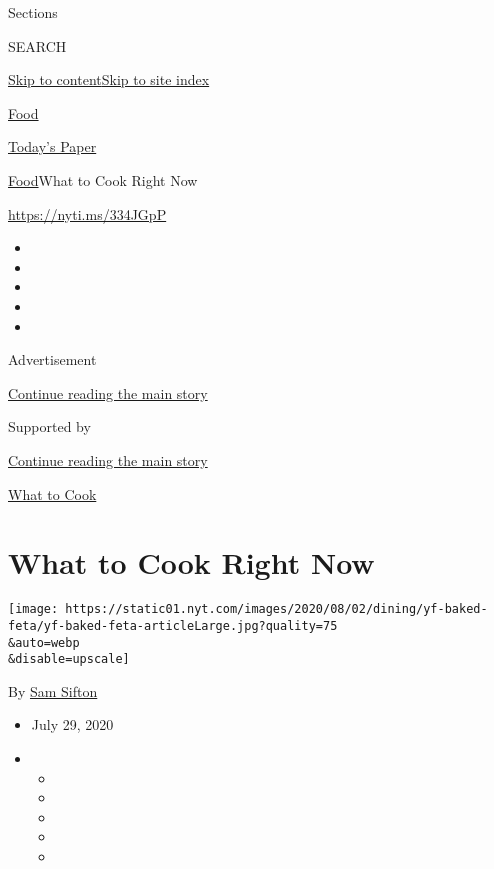 Sections

SEARCH

\protect\hyperlink{site-content}{Skip to
content}\protect\hyperlink{site-index}{Skip to site index}

\href{https://www.nytimes.com/section/food}{Food}

\href{https://myaccount.nytimes.com/auth/login?response_type=cookie\&client_id=vi}{}

\href{https://www.nytimes.com/section/todayspaper}{Today's Paper}

\href{/section/food}{Food}\textbar{}What to Cook Right Now

\url{https://nyti.ms/334JGpP}

\begin{itemize}
\item
\item
\item
\item
\item
\end{itemize}

Advertisement

\protect\hyperlink{after-top}{Continue reading the main story}

Supported by

\protect\hyperlink{after-sponsor}{Continue reading the main story}

\href{/column/what-to-cook}{What to Cook}

\hypertarget{what-to-cook-right-now}{%
\section{What to Cook Right Now}\label{what-to-cook-right-now}}

\texttt{[image: https://static01.nyt.com/images/2020/08/02/dining/yf-baked-feta/yf-baked-feta-articleLarge.jpg?quality=75\\\&auto=webp\\\&disable=upscale]}

By \href{https://www.nytimes.com/by/sam-sifton}{Sam Sifton}

\begin{itemize}
\item
  July 29, 2020
\item
  \begin{itemize}
  \item
  \item
  \item
  \item
  \item
  \end{itemize}
\end{itemize}

